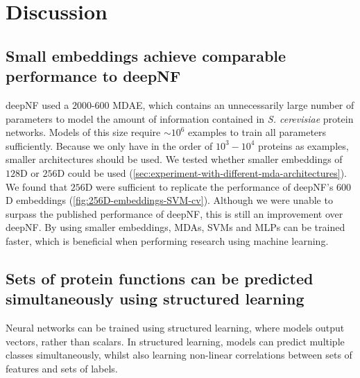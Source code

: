 \section{Discussion}


\subsection{Small embeddings achieve comparable performance to deepNF}

deepNF used a $2000$-$600$ MDAE, which contains an unnecessarily large number of parameters to model the amount of information contained in \emph{S. cerevisiae} protein networks.
Models of this size require $\sim 10^6$ examples to train all parameters sufficiently.
Because we only have in the order of $10^3 - 10^4$ proteins as examples, smaller architectures should be used.
We tested whether smaller embeddings of $128$D or $256$D could be used (\ref{sec:experiment-with-different-mda-architectures}).
We found that $256$D were sufficient to replicate the performance of deepNF's $600$D embeddings (\ref{fig:256D-embeddings-SVM-cv}).
Although we were unable to surpass the published performance of deepNF, this is still an improvement over deepNF.
By using smaller embeddings, MDAs, SVMs and MLPs can be trained faster, which is beneficial when performing research using machine learning.

\subsection{Sets of protein functions can be predicted simultaneously using structured learning}

Neural networks can be trained using structured learning, where models output vectors, rather than scalars.
In structured learning, models can predict multiple classes simultaneously, whilst also learning non-linear correlations between sets of features and sets of labels.


